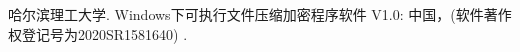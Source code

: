 \begin{resume}

  \begin{achievements}
    \item 哈尔滨理工大学. Windows下可执行文件压缩加密程序软件 V1.0: 中国，(软件著作权登记号为2020SR1581640) . 
  \end{achievements}

\end{resume}
